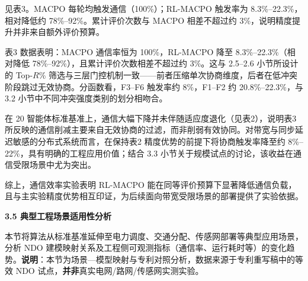 \par
\indent
\par
见表3。MACPO 每轮均触发通信（100\%）；RL-MACPO 触发率为 8.3\%--22.3\%，相对降低约 78\%--92\%。累计评价次数与 MACPO 相差不超过约 3\%，说明精度提升并非来自额外评价预算。

\par{}

\par
\indent
\par
表3 数据表明：MACPO 通信率恒为 100\%，RL-MACPO 降至 8.3\%--22.3\%（相对降低 78\%--92\%），且累计评价次数相差不超过约 3\%。这与 2.5--2.6 小节所设计的 Top-$R$\% 筛选与三层门控机制一致——前者压缩单次协商维度，后者在低冲突阶段跳过无效协商。分函数看，F3--F6 触发率约 8\%，F1--F2 约 20.8\%--22.3\%，与 3.2 小节中不同冲突强度类别的划分相吻合。

\par
\indent
在 20 智能体标准基准上，通信大幅下降并未伴随适应度退化（见表2），说明表3 所反映的通信削减主要来自无效协商的过滤，而非削弱有效协同。对带宽与同步延迟敏感的分布式系统而言，在保持表2 精度优势的前提下将协商触发率降至约 8\%--22\%，具有明确的工程应用价值；结合 3.3 小节关于规模试点的讨论，该收益在通信受限场景中尤为突出。

\par
\indent
综上，通信效率实验表明 RL-MACPO 能在同等评价预算下显著降低通信负载，且与主实验精度优势相互印证，为后续面向带宽受限场景的部署提供了实验依据。


\par
\indent
\textbf{3.5 典型工程场景适用性分析}
\par
\par
本节将算法从标准基准延伸至电力调度、交通分配、传感网部署等典型应用场景，分析 NDO 建模映射关系及工程侧可观测指标（通信率、运行耗时等）的变化趋势。\textbf{说明}：本节为场景—模型映射与专利对照分析，数据来源于专利重写稿中的等效 NDO 试点，\textbf{并非}真实电网/路网/传感网实测实验。

